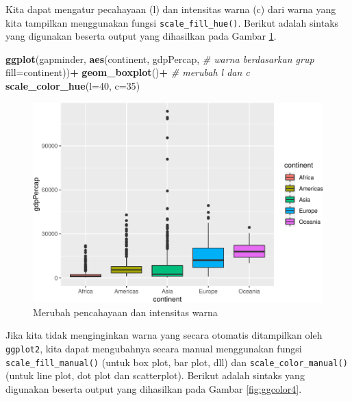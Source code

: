 \documentclass[]{book}
\newenvironment{Shaded}{\begin{snugshade}}{\end{snugshade}}
\newcommand{\KeywordTok}[1]{\textcolor[rgb]{0.13,0.29,0.53}{\textbf{#1}}}
\newcommand{\DataTypeTok}[1]{\textcolor[rgb]{0.13,0.29,0.53}{#1}}
\newcommand{\DecValTok}[1]{\textcolor[rgb]{0.00,0.00,0.81}{#1}}
\newcommand{\StringTok}[1]{\textcolor[rgb]{0.31,0.60,0.02}{#1}}
\newcommand{\CommentTok}[1]{\textcolor[rgb]{0.56,0.35,0.01}{\textit{#1}}}
\newcommand{\OperatorTok}[1]{\textcolor[rgb]{0.81,0.36,0.00}{\textbf{#1}}}
\newcommand{\NormalTok}[1]{#1}
\begin{document}
Kita dapat mengatur pecahayaan (l) dan intensitas warna (c) dari warna
yang kita tampilkan menggunakan fungsi \texttt{scale\_fill\_hue()}.
Berikut adalah sintaks yang digunakan beserta output yang dihasilkan
pada Gambar \ref{fig:ggcolor3}.

\begin{Shaded}
\begin{Highlighting}[]
\KeywordTok{ggplot}\NormalTok{(gapminder, }\KeywordTok{aes}\NormalTok{(continent, gdpPercap, }
                      \CommentTok{# warna berdasarkan grup}
                      \DataTypeTok{fill=}\NormalTok{continent))}\OperatorTok{+}
\StringTok{  }\KeywordTok{geom_boxplot}\NormalTok{()}\OperatorTok{+}
\StringTok{  }\CommentTok{# merubah l dan c}
\StringTok{  }\KeywordTok{scale_color_hue}\NormalTok{(}\DataTypeTok{l=}\DecValTok{40}\NormalTok{, }\DataTypeTok{c=}\DecValTok{35}\NormalTok{)}
\end{Highlighting}
\end{Shaded}

\begin{figure}

{\centering \includegraphics[width=0.7\linewidth]{EnvStat_files/figure-latex/ggcolor3-1} 

}

\caption{Merubah pencahayaan dan intensitas warna}\label{fig:ggcolor3}
\end{figure}

Jika kita tidak menginginkan warna yang secara otomatis ditampilkan oleh
\texttt{ggplot2}, kita dapat mengubahnya secara manual menggunakan
fungsi \texttt{scale\_fill\_manual()} (untuk box plot, bar plot, dll)
dan \texttt{scale\_color\_manual()} (untuk line plot, dot plot dan
scatterplot). Berikut adalah sintaks yang digunakan beserta output yang
dihasilkan pada Gambar \ref{fig:ggcolor4}.
\end{document}
